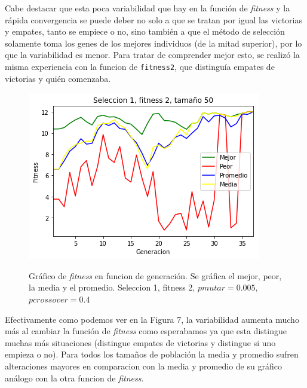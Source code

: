 \documentclass[A4paper,oneside,fleqn,11pt]{article}
\theoremstyle{definition}
\begin{document}
Cabe destacar que esta poca variabilidad que hay en la función de \textit{fitness} y la rápida convergencia se puede deber no solo a que se tratan por igual las victorias y empates, tanto se empiece o no, sino también a que el método de selección solamente toma los genes de los mejores individuos (de la mitad superior), por lo que la variabilidad es menor. Para tratar de comprender mejor esto, se realizó la misma experiencia con la funcion de \texttt{fitness2}, que distinguía empates de victorias y quién comenzaba.





\begin{figure}[H]
	\captionsetup[subfigure]{position=b}
	\centering
		{\includegraphics[width=0.3\linewidth]{s1f2t50.png}}
	\caption{Gráfico de \textit{fitness} en funcion de generación. Se gráfica el mejor, peor, la media y el promedio. Seleccion 1, fitness 2, $pmutar=0.005$, $pcrossover=0.4$}
\end{figure}

Efectivamente como podemos ver en la Figura 7, la variabilidad aumenta mucho más al cambiar la función de \textit{fitness} como esperabamos ya que esta distingue muchas más situaciones (distingue empates de victorias y distingue si uno empieza o no). Para todos los tamaños de población la media y promedio sufren alteraciones mayores en comparacion con la media y promedio de su gráfico análogo con la otra funcion de \textit{fitness}.
\end{document}
